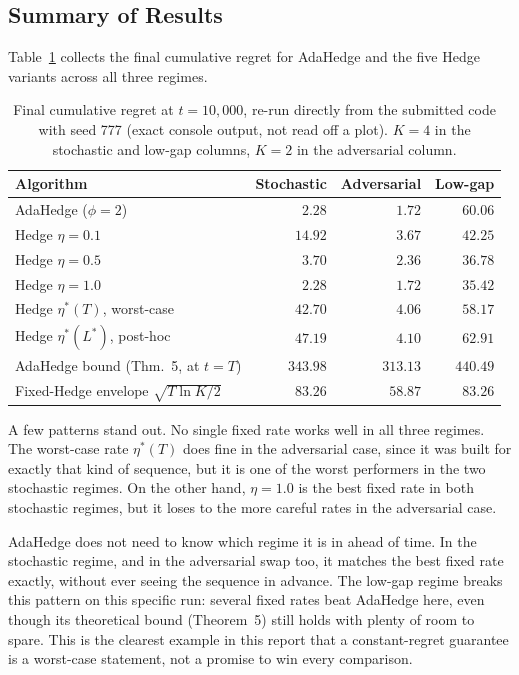 \documentclass[11pt,a4paper]{article}
\begin{document}
\subsection{Summary of Results}

Table~\ref{tab:summary} collects the final cumulative regret for AdaHedge and
the five Hedge variants across all three regimes.

\begin{table}[h]
  \centering
  \small
  \caption{Final cumulative regret at $t = 10{,}000$, re-run directly from the
  submitted code with seed 777 (exact console output, not read off a plot).
  $K=4$ in the stochastic and low-gap columns, $K=2$ in the adversarial column.}
  \label{tab:summary}
  \begin{tabular}{lrrr}
    \toprule
    Algorithm & Stochastic & Adversarial & Low-gap \\
    \midrule
    AdaHedge ($\phi = 2$)              & $2.28$  & $1.72$ & $60.06$ \\
    Hedge $\eta = 0.1$                  & $14.92$ & $3.67$ & $42.25$ \\
    Hedge $\eta = 0.5$                  & $3.70$  & $2.36$ & $36.78$ \\
    Hedge $\eta = 1.0$                  & $2.28$  & $1.72$ & $35.42$ \\
    Hedge $\eta^*(T)$, worst-case       & $42.70$ & $4.06$ & $58.17$ \\
    Hedge $\eta^*(L^*)$, post-hoc       & $47.19$ & $4.10$ & $62.91$ \\
    AdaHedge bound (Thm.~5, at $t=T$)   & $343.98$ & $313.13$ & $440.49$ \\
    Fixed-Hedge envelope $\sqrt{T\ln K/2}$ & $83.26$ & $58.87$ & $83.26$ \\
    \bottomrule
  \end{tabular}
\end{table}

A few patterns stand out. No single fixed rate works well in all three
regimes. The worst-case rate $\eta^*(T)$ does fine in the adversarial case,
since it was built for exactly that kind of sequence, but it is one of the
worst performers in the two stochastic regimes. On the other hand, $\eta=1.0$
is the best fixed rate in both stochastic regimes, but it loses to the more
careful rates in the adversarial case.

AdaHedge does not need to know which regime it is in ahead of time. In the
stochastic regime, and in the adversarial swap too, it matches the best fixed
rate exactly, without ever seeing the sequence in advance. The low-gap regime
breaks this pattern on this specific run: several fixed rates beat AdaHedge
here, even though its theoretical bound (Theorem~5) still holds with plenty
of room to spare. This is the clearest example in this report that a
constant-regret guarantee is a worst-case statement, not a promise to win
every comparison.
\end{document}
